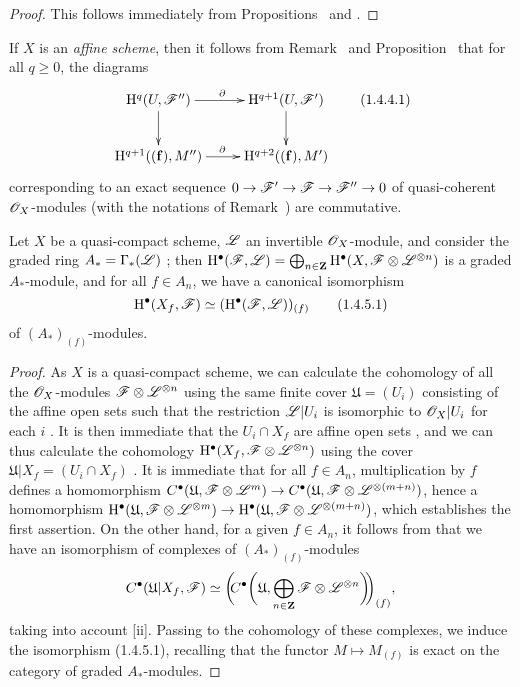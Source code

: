 \begin{proof}
\label{proof-III.1.4.3}
This follows immediately from Propositions~ and .
\end{proof}

\begin{env}[1.4.4]
\label{III.1.4.4}
If $X$ is an \emph{affine scheme}, then it follows from Remark~ and Proposition~ that for all $q\geq 0$, the diagrams
\[
  \xymatrix{
    \HH^q(U,\sh{F}'')\ar[r]^\partial\ar[d] &
    \HH^{q+1}(U,\sh{F}')\ar[d]\\
    \HH^{q+1}((\mathbf{f}),M'')\ar[r]^\partial &
    \HH^{q+2}((\mathbf{f}),M')
  }
  \tag{1.4.4.1}
\]
corresponding to an exact sequence $0\to\sh{F}'\to\sh{F}\to\sh{F}''\to 0$ of quasi-coherent $\mathscr{O}_X$-modules (with the notations of Remark~) are commutative.
\end{env}

\begin{proposition}[1.4.5]
\label{III.1.4.5}
Let $X$ be a quasi-compact scheme, $\mathscr{L}$ an invertible $\mathscr{O}_X$-module, and consider the graded ring $A_*=\Gamma_*(\mathscr{L})$ ; then $\mathrm{H}^\bullet(\mathscr{F},\mathscr{L})=\bigoplus_{n\in\mathbf{Z}}\mathrm{H}^\bullet(X,\mathscr{F}\otimes\mathscr{L}^{\otimes n})$ is a graded $A_*$-module, and for all $f\in A_n$, we have a canonical isomorphism
\[
  \mathrm{H}^\bullet(X_f,\mathscr{F})\simeq(\mathrm{H}^\bullet(\mathscr{F},\mathscr{L}))_{(f)}
  \tag{1.4.5.1}
\]
of $(A_*)_{(f)}$-modules.
\end{proposition}

\begin{proof}
\label{proof-III.1.4.5}
As $X$ is a quasi-compact scheme, we can calculate the cohomology of all the $\mathscr{O}_X$-modules $\mathscr{F}\otimes\mathscr{L}^{\otimes n}$ using the same finite cover $\mathfrak{U}=(U_i)$ consisting of the affine open sets such that the restriction $\mathscr{L}|U_i$ is isomorphic to $\mathscr{O}_X|U_i$ for each $i$ .
It is then immediate that the $U_i\cap X_f$ are affine open sets , and we can thus calculate the cohomology $\mathrm{H}^\bullet(X_f,\mathscr{F}\otimes\mathscr{L}^{\otimes n})$ using the cover $\mathfrak{U}|X_f=(U_i\cap X_f)$ .
It is immediate that for all $f\in A_n$, multiplication by $f$ defines a homomorphism $C^\bullet(\mathfrak{U},\sh{F}\otimes\sh{L}^m)\to C^\bullet(\mathfrak{U},\sh{F}\otimes\sh{L}^{\otimes(m+n)})$, hence a homomorphism $\HH^\bullet(\mathfrak{U},\sh{F}\otimes\sh{L}^{\otimes m})\to\HH^\bullet(\mathfrak{U},\sh{F}\otimes\sh{L}^{\otimes(m+n)})$, which establishes the first assertion.
On the other hand, for a given $f\in A_n$, it follows from  that we have an isomorphism of complexes of $(A_*)_{(f)}$-modules
\[
  C^\bullet(\mathfrak{U}|X_f,\mathscr{F})\simeq\bigg(\!\!C^\bullet\bigg(\mathfrak{U},\bigoplus_{n\in\mathbf{Z}}\mathscr{F}\otimes\mathscr{L}^{\otimes n}\bigg)\!\!\bigg)_{(f)},
\]
taking into account [ii].
Passing to the cohomology of these complexes, we induce the isomorphism (1.4.5.1), recalling that the functor $M\mapsto M_{(f)}$ is exact on the category of graded $A_*$-modules.
\end{proof}

